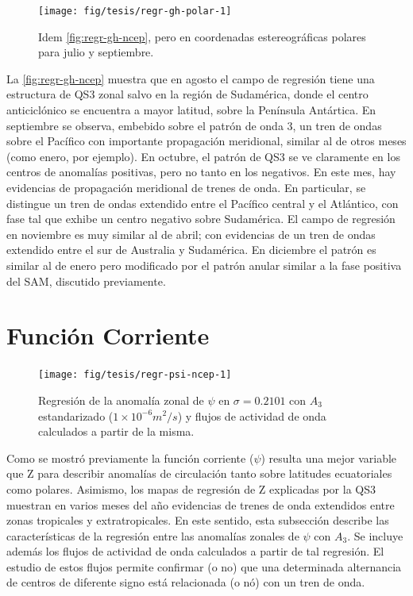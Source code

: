 \documentclass[spanish,a4paper,12pt,oneside]{book}
\begin{document}
\begin{figure}
\texttt{[image: fig/tesis/regr-gh-polar-1]} \caption{Idem \autoref{fig:regr-gh-ncep}, pero en coordenadas estereográficas polares para julio y septiembre.}\label{fig:regr-gh-polar}
\end{figure}

La \autoref{fig:regr-gh-ncep} muestra que en agosto el campo de
regresión tiene una estructura de QS3 zonal salvo en la región de
Sudamérica, donde el centro anticiclónico se encuentra a mayor latitud,
sobre la Península Antártica. En septiembre se observa, embebido sobre
el patrón de onda 3, un tren de ondas sobre el Pacífico con importante
propagación meridional, similar al de otros meses (como enero, por
ejemplo). En octubre, el patrón de QS3 se ve claramente en los centros
de anomalías positivas, pero no tanto en los negativos. En este mes, hay
evidencias de propagación meridional de trenes de onda. En particular,
se distingue un tren de ondas extendido entre el Pacífico central y el
Atlántico, con fase tal que exhibe un centro negativo sobre Sudamérica.
El campo de regresión en noviembre es muy similar al de abril; con
evidencias de un tren de ondas extendido entre el sur de Australia y
Sudamérica. En diciembre el patrón es similar al de enero pero
modificado por el patrón anular similar a la fase positiva del SAM,
discutido previamente.

\section*{Función Corriente}

\begin{landscape}\begin{figure}

{\centering \texttt{[image: fig/tesis/regr-psi-ncep-1]} 

}

\caption{Regresión de la anomalía zonal de $\psi$ en $\sigma = 0.2101$ con $A_3$ estandarizado ($1\times10^{-6}m^2/s$) y flujos de actividad de onda calculados a partir de la misma.}\label{fig:regr-psi-ncep}
\end{figure}
\end{landscape}

Como se mostró previamente la función corriente (\(\psi\)) resulta una
mejor variable que Z para describir anomalías de circulación tanto sobre
latitudes ecuatoriales como polares. Asimismo, los mapas de regresión de
Z explicadas por la QS3 muestran en varios meses del año evidencias de
trenes de onda extendidos entre zonas tropicales y extratropicales. En
este sentido, esta subsección describe las características de la
regresión entre las anomalías zonales de \(\psi\) con \(A_3\). Se
incluye además los flujos de actividad de onda calculados a partir de
tal regresión. El estudio de estos flujos permite confirmar (o no) que
una determinada alternancia de centros de diferente signo está
relacionada (o nó) con un tren de onda.
\end{document}
